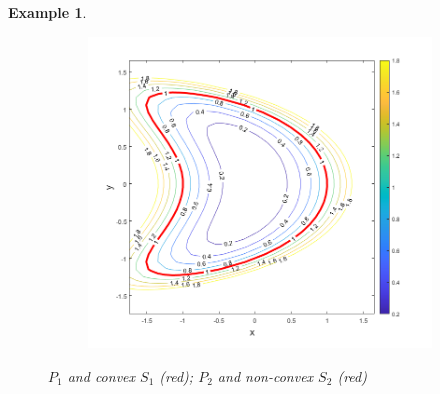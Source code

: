 \documentclass[11pt]{article}
\newtheorem{example}{Example}
\theoremstyle{remark}
\begin{document}
\begin{example}
\begin{figure}[!htb]
\begin{subfigure}{0.5\textwidth}
    \includegraphics[scale=0.45]{non_convex_S_levelsets.png}
    \end{subfigure}
    \caption{$P_1$ and convex $S_{1}$ (red); $P_2$ and non-convex $S_2$ (red)}
    \label{fig:non_convex_SQ}
\end{figure}
\end{example}
\end{document}
